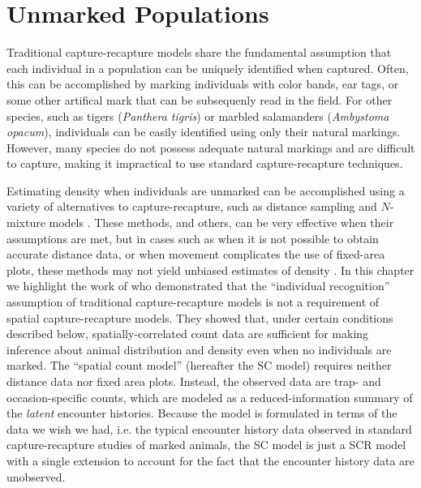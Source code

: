 \chapter{Unmarked Populations}
\label{chapt.scr-unmarked}

\vspace{0.3cm}


Traditional capture-recapture models share the fundamental
assumption that each individual in a population can be uniquely
identified when captured. Often, this can be accomplished
by marking individuals with color bands, ear tags, or some other
artifical mark that can be subsequenly read in the field. For other
species, such as tigers (\textit{Panthera tigris}) or
marbled salamanders (\textit{Ambystoma opacum}),
individuals can be easily identified
using only their natural markings. However, many species
do not possess adequate natural markings and are
difficult to capture, making it impractical to use standard
capture-recapture techniques.

Estimating density when individuals are unmarked can be accomplished
using a variety of alternatives to capture-recapture, such as distance
sampling \citep{buckland_etal:2001} and $N$-mixture models
\citep{royle:2004biom}. These methods, and others, can be
very effective when their assumptions are met, but in cases such as
when it is not possible to obtain accurate distance data, or when
movement complicates the use of fixed-area plots,
these methods may not yield unbiased estimates of density
\citep{chandler_etal:2011}. In this chapter we highlight the work of
\citet{chandler_royle:2012} who demonstrated that the ``individual
recognition'' assumption of traditional capture-recapture models is not a
requirement of spatial capture-recapture models. They showed that,
under certain conditions described below, spatially-correlated count
data are sufficient for making inference about animal distribution and
density even when no individuals are marked.
The \citet{chandler_royle:2012} ``spatial count model'' (hereafter the SC
model) requires neither distance data nor fixed area plots. Instead,
the observed data are trap- and occasion-specific counts, which
are modeled as a reduced-information summary of the \textit{latent}
encounter histories. Because the model is formulated in terms of the
data we wish we had, i.e. the typical encounter history data observed
in standard capture-recapture studies of marked animals, the SC model
is just a SCR model with a single extension to account for the fact
that the encounter history data are unobserved.

